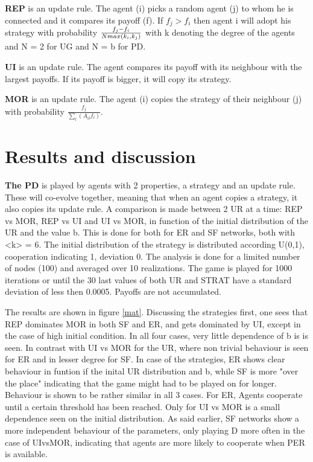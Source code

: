 \textbf{REP} is an update rule. The agent (i) picks a random agent (j) to whom he is connected and it compares its payoff (f). If $f_j > f_i$ then agent i will adopt his strategy with probability $\frac{f_j-f_i}{N\space max(k_i,k_j)}$
with k denoting the degree of the agents and N = 2 for UG and N = b for PD.

\textbf{UI} is an update rule. The agent compares its payoff with its neighbour with the largest payoffs. If its payoff is bigger, it will copy its strategy.

\textbf{MOR} is an update rule. The agent (i) copies the strategy of their neighbour (j) with probability $\frac{f_j}{\sum_{l}(A_{il} f_l)}$.


\section{Results and discussion}


\textbf{The PD} is played by agents with 2 properties, a strategy and an update rule. These will co-evolve together, meaning that when an agent copies a strategy, it also copies its update rule. A comparison is made between 2 UR at a time: REP vs MOR,  REP vs UI and UI vs MOR, in function of the initial distribution of the UR and the value b.
This is done for both for ER and SF networks, both with <k> = 6. The initial distribution of the strategy is distributed according U(0,1), cooperation indicating 1, deviation 0. The analysis is done for a limited number of nodes (100) and averaged over 10 realizations. The game is played for 1000 iterations or until the 30 last values of both UR and STRAT have a standard deviation of less then 0.0005.  Payoffs are not accumulated.

The results are shown in figure  \ref{mat}. Discussing the strategies first, one sees that REP dominates MOR in both SF and ER, and gets dominated by UI, except in the case of high initial condition.
In all four cases, very little dependence of b is is seen. In contrast with UI vs MOR for the UR, where non trivial behaviour is seen for ER and in lesser degree for SF.  In case of the strategies, ER shows clear behaviour in funtion if the inital UR distribution and b, while SF is more "over the place" indicating that the game might had to be played on for longer. Behaviour is shown to be rather similar in all 3 cases. For ER,  Agents cooperate until a certain threshold has been reached. Only for UI vs MOR is a small dependence seen on the initial distribution. 
As said earlier, SF networks show a more independent behaviour of the parameters, only playing D more often in the case of UIvsMOR, indicating that agents are more likely to cooperate when PER is available.




